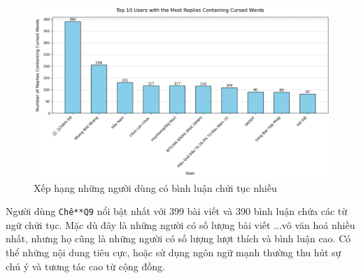 \begin{figure}[H]
    \centering
    \includegraphics[width=0.85\linewidth]{images/C2_pic36.png}
    \caption{Xếp hạng những người dùng có bình luận chửi tục nhiều}
    \label{fig:2.26}
\end{figure}

Người dùng \texttt{Chê**Q9} nổi bật nhất với 399 bài viết và 390 bình luận chứa các từ ngữ chửi tục. Mặc dù đây là những người có số lượng bài viết ...vô văn hoá nhiều nhất, nhưng họ cũng là những người có số lượng lượt thích và bình luận cao. Có thể những nội dung tiêu cực, hoặc sử dụng ngôn ngữ mạnh thường thu hút sự chú ý và tương tác cao từ cộng đồng. 

